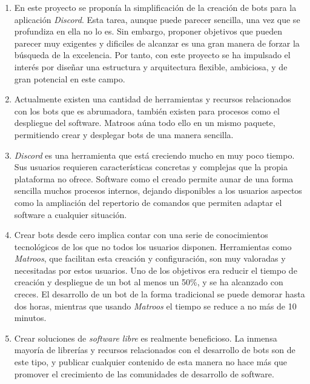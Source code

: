 \begin{enumerate}
	\item En este proyecto se proponía la simplificación de la creación de bots para la aplicación \textit{Discord}. Esta tarea, aunque puede parecer sencilla, una vez que se profundiza en ella no lo es. Sin embargo, proponer objetivos que pueden parecer muy exigentes y dificiles de alcanzar es una gran manera de forzar la búsqueda de la excelencia. Por tanto, con este proyecto se ha impulsado el interés por diseñar una estructura y arquitectura flexible, ambiciosa, y de gran potencial en este campo.
	
	\item Actualmente existen una cantidad de herramientas y recursos relacionados con los bots que es abrumadora, también existen para procesos como el despliegue del software. Matroos aúna todo ello en un mismo paquete, permitiendo crear y desplegar bots de una manera sencilla.

	\item \textit{Discord} es una herramienta que está creciendo mucho en muy poco tiempo. Sus usuarios requieren características concretas y complejas que la propia plataforma no ofrece. Software como el creado permite aunar de una forma sencilla muchos procesos internos, dejando disponibles a los usuarios aspectos como la ampliación del repertorio de comandos que permiten adaptar el software a cualquier situación.

	\item Crear bots desde cero implica contar con una serie de conocimientos tecnológicos de los que no todos los usuarios disponen. Herramientas como \textit{Matroos}, que facilitan esta creación y configuración, son muy valoradas y necesitadas por estos usuarios. Uno de los objetivos era reducir el tiempo de creación y despliegue de un bot al menos  un 50\%, y se ha alcanzado con creces. El desarrollo de un bot de la forma tradicional se puede demorar hasta dos horas, mientras que usando \textit{Matroos} el tiempo se reduce a no más de 10 minutos.

	\item Crear soluciones de \textit{software libre} es realmente beneficioso. La inmensa mayoría de librerías y recursos relacionados con el desarrollo de bots son de este tipo, y publicar cualquier contenido de esta manera no hace más que promover el crecimiento de las comunidades de desarrollo de software.
\end{enumerate}





